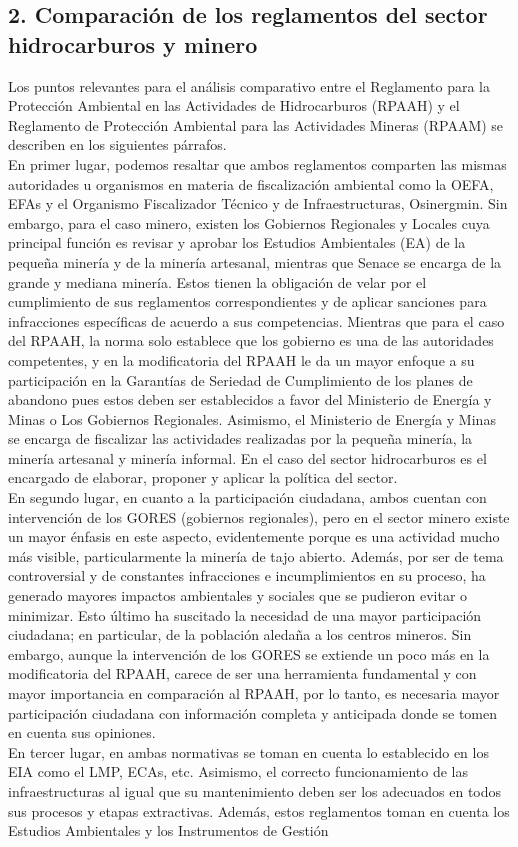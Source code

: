 \documentclass[12pt, a4paper]{article} %
\begin{document}
\begin{multicols}{2}
        \section*{2. Comparación de los reglamentos del sector hidrocarburos y minero}
        Los puntos relevantes para el análisis comparativo entre el Reglamento para la Protección Ambiental en las Actividades de Hidrocarburos (RPAAH) y el Reglamento de Protección Ambiental para las Actividades Mineras (RPAAM) se describen en los siguientes párrafos. \\ En primer lugar, podemos resaltar que ambos reglamentos comparten las mismas autoridades u organismos en materia de fiscalización ambiental como la OEFA, EFAs y el Organismo Fiscalizador Técnico y de Infraestructuras, Osinergmin. Sin embargo, para el caso minero, existen los Gobiernos Regionales y Locales cuya principal función es revisar y aprobar los Estudios Ambientales (EA) de la pequeña minería y de la minería artesanal, mientras que Senace se encarga de la grande y mediana minería. Estos tienen la obligación de velar por el cumplimiento de sus reglamentos correspondientes y de aplicar sanciones para infracciones específicas de acuerdo a sus competencias. Mientras que para el caso del RPAAH, la norma solo establece que los gobierno es una de las autoridades competentes, y en la modificatoria del RPAAH le da un mayor enfoque a su participación en la Garantías de Seriedad de Cumplimiento de los planes de abandono pues estos deben ser establecidos a favor del Ministerio de Energía y Minas o Los Gobiernos Regionales. Asimismo, el Ministerio de Energía y Minas se encarga de fiscalizar las actividades realizadas por la pequeña minería, la minería artesanal y minería informal. En el caso del sector hidrocarburos es el encargado de elaborar, proponer y aplicar la política del sector.\\En segundo lugar, en cuanto a la participación ciudadana, ambos cuentan con intervención de los GORES (gobiernos regionales), pero en el sector minero existe un mayor énfasis en este aspecto, evidentemente porque es una actividad mucho más visible, particularmente la minería de tajo abierto. Además, por ser de tema controversial y de constantes infracciones e incumplimientos en su proceso, ha generado mayores impactos ambientales y sociales que se pudieron evitar o minimizar. Esto último ha suscitado la necesidad de una mayor participación ciudadana; en particular, de la población aledaña a los centros mineros. Sin embargo, aunque la intervención de los GORES se extiende un poco más en la modificatoria del RPAAH, carece de ser una herramienta fundamental y con mayor importancia en comparación al RPAAH, por lo tanto, es necesaria mayor participación ciudadana con información completa y anticipada donde se tomen en cuenta sus opiniones.\\En tercer lugar, en ambas normativas se toman en cuenta lo establecido en los EIA como el LMP, ECAs, etc. Asimismo, el correcto funcionamiento de las infraestructuras al igual que su mantenimiento deben ser los adecuados en todos sus procesos y etapas extractivas. Además, estos reglamentos toman en cuenta los Estudios Ambientales y los Instrumentos de Gestión 
\end{multicols}
\end{document}

